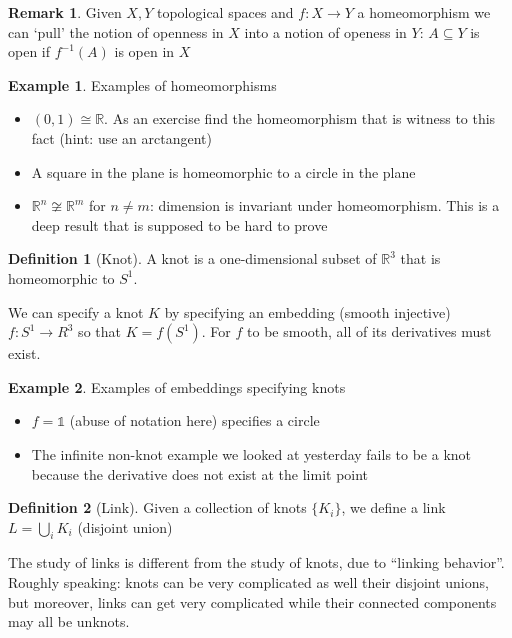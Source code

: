 \documentclass[11pt]{article}
\newcommand{\R}{\mathbb{R}}
\newcommand{\set}[1]{\{ #1 \}}
\theoremstyle{plain}
\theoremstyle{definition}
\newtheorem{remark}{Remark}
\newtheorem{definition}{Definition}
\newtheorem{ex}{Example}
\begin{document}
\begin{remark}
  Given $X, Y$ topological spaces and $f: X \to Y$ a homeomorphism we can `pull' the notion of openness in $X$ into
  a notion of openess in $Y$: $A \subseteq Y$ is open if $f^{-1}(A)$ is open in $X$
\end{remark}



\begin{ex}
  Examples of homeomorphisms
  \begin{itemize}
  \item $(0, 1) \cong \R$. As an exercise find the homeomorphism that is witness to this fact (hint: use an arctangent)
  \item A square in the plane is homeomorphic to a circle in the plane
  \item $\R^n \not \cong \R^m$ for $n \neq m$: dimension is invariant under homeomorphism. This is a deep result
    that is supposed to be hard to prove
  \end{itemize}
\end{ex}


\begin{definition}[Knot]
  A knot is a one-dimensional subset of $\R^3$ that is homeomorphic to $S^1$.

  We can specify a knot $K$ by specifying an embedding (smooth injective) $f: S^1 \to R^3$
  so that $K = f(S^1)$. For $f$ to be smooth, all of its derivatives must exist.
\end{definition}


\begin{ex}
  Examples of embeddings specifying knots
  \begin{itemize}
  \item $f = \mathds{1}$ (abuse of notation here) specifies a circle
  \item The infinite non-knot example we looked at yesterday fails to be a knot because the derivative does not exist
    at the limit point
  \end{itemize}
\end{ex}


\begin{definition}[Link]
  Given a collection of knots $\set{K_i}$, we define a link $L = \bigcup_i K_i$ (disjoint union)
\end{definition}

The study of links is different from the study of knots, due to ``linking behavior''. Roughly speaking: knots can be very complicated as well their disjoint unions, but moreover, links can get very complicated while their connected components may all be unknots.
\end{document}
